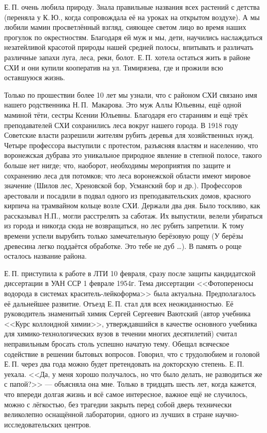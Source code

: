 Е.\,П. очень любила природу. Знала правильные названия всех растений с детства (переняла у К.\,Ю., когда сопровождала её на уроках на открытом воздухе). А мы любили мамин просветлённый взгляд, сияющее светом лицо во время наших прогулок по окрестностям. Благодаря ей муж и мы, дети, научились наслаждаться незатейливой красотой природы нашей средней полосы, впитывать и различать различные запахи луга, леса, реки, болот.
Е.\,П. хотела остаться жить в районе СХИ и они купили кооператив на ул. Тимирязева, где и прожили всю оставшуюся жизнь.

Только по прошествии более 10 лет мы узнали, что с районом СХИ связано имя нашего родственника Н.\,П.~Макарова. Это муж Аллы Юльевны, ещё одной маминой тёти, сестры Ксении Юльевны. Благодаря его стараниям и ещё трёх преподавателей СХИ  сохранились леса вокруг нашего города. В 1918 году Советские власти разрешили жителям рубить деревья для хозяйственных нужд. Четыре профессора выступили с протестом, разъясняя властям и населению, что воронежская дубрава это уникальное природное явление в степной полосе, такого больше нет нигде; что, наоборот, необходимы мероприятия по защите и сохранению леса для потомков; что леса воронежской области имеют мировое значение (Шилов лес, Хреновской бор, Усманский бор и др.). Профессоров арестовали и посадили в подвал одного из преподавательских домов, красного кирпича на трамвайном кольце возле СХИ. Держали два дня. Было тоскливо, как рассказывал Н.П., могли расстрелять за саботаж. Их выпустили, велели убираться из города и никогда сюда не возвращаться, но лес рубить запретили. К тому времени успели вырубить только замечательную берёзовую рощу (У берёзы древесина легко поддаётся обработке. Это тебе не дуб \ldots). В память о роще осталось название района.

Е.\,П. приступила к работе в ЛТИ 10 февраля, сразу после защиты кандидатской диссертации в УАН ССР 1 феврале 1954г. Тема диссертации <<Фотопереносы водорода в системах краситель-лейкоформа>> была актуальна. Предполагалось её дальнейшее развитие. Отъезд Е.\,П. стал для всех неожиданностью. Её руководитель знаменитый химик Сергей Сергеевич Ваютский (автор учебника <<Курс коллоидной химии>>, утверждавшийся в качестве основного учебника для химико-технологических вузов в течении многих десятилетий) считал неправильным бросать столь успешно начатую тему. Обещал всяческое содействие в решении бытовых вопросов. Говорил, что с трудолюбием и головой Е.\,П. через два года можно будет претендовать на докторскую степень. Е.\,П. уехала. <<Да, у меня хорошо получалось, но что было делать, не разводиться же с папой?>> --- объясняла она мне. Только в тридцать шесть лет, когда кажется, что впереди долгая жизнь и всё самое интересное, важное ещё не случилось, можно с лёгкостью, без трагедии закрыть перед собой дверь технически великолепно оснащённой лаборатории, одного из лучших в стране научно-исследовательских центров.

